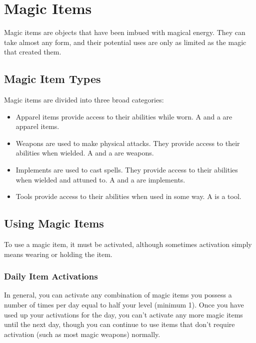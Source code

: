 \chapter{Magic Items}

Magic items are objects that have been imbued with magical energy. They can take almost any form, and their potential uses are only as limited as the magic that created them.

\section{Magic Item Types}
    Magic items are divided into three broad categories:
    \begin{itemize}
        \item Apparel items provide access to their abilities while worn.
            A  and a  are apparel items.
        \item Weapons are used to make physical attacks. They provide access to their abilities when wielded.
            A  and a  are weapons.
        \item Implements are used to cast spells. They provide access to their abilities when wielded and attuned to.
            A  and a  are implements.
        \item Tools provide access to their abilities when used in some way.
            A  is a tool.
    \end{itemize}

\section{Using Magic Items}

    To use a magic item, it must be activated, although sometimes activation simply means wearing or holding the item.

    \subsection{Daily Item Activations}
        In general, you can activate any combination of magic items you possess a number of times per day equal to half your level (minimum 1).
        Once you have used up your activations for the day, you can't activate any more magic items until the next day, though you can continue to use items that don't require activation (such as most magic weapons) normally.

